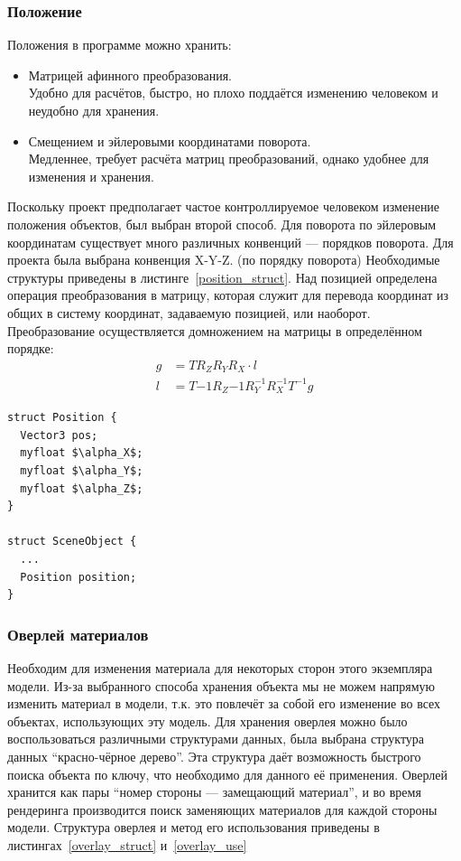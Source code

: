 \documentclass[a4paper,12pt]{report}
\numberwithin{equation}{section}
\begin{document}
\subsubsection{Положение}
Положения в программе можно хранить:
\begin{itemize}
\item Матрицей афинного преобразования. \\
Удобно для расчётов, быстро, но плохо поддаётся изменению человеком и неудобно для хранения.
\item Смещением и эйлеровыми координатами поворота. \\
Медленнее, требует расчёта матриц преобразований, однако удобнее для изменения и хранения.
\end{itemize}
Поскольку проект предполагает частое контроллируемое человеком изменение положения объектов, был выбран второй способ. Для поворота по эйлеровым координатам существует много различных конвенций --- порядков поворота. Для проекта была выбрана конвенция X-Y-Z. (по порядку поворота) Необходимые структуры приведены в листинге~\ref{position_struct}. Над позицией определена операция преобразования в матрицу, которая служит для перевода координат из общих в систему координат, задаваемую позицией, или наоборот. Преобразование осуществляется домножением на матрицы в определённом порядке:
\begin{align}
g &= T R_Z R_Y R_X \cdot l \\
l &= T{-1} R_Z{-1} R_Y^{-1} R_X^{-1} T^{-1} g
\end{align}
\begin{lstlisting}[float=h,caption={Структура данных ``Позиция''},label=position_struct]
struct Position {
  Vector3 pos;
  myfloat $\alpha_X$;
  myfloat $\alpha_Y$;
  myfloat $\alpha_Z$;
}

struct SceneObject {
  ...
  Position position;
}
\end{lstlisting}

\subsubsection{Оверлей материалов}
Необходим для изменения материала для некоторых сторон этого экземпляра модели. Из-за выбранного способа хранения объекта мы не можем напрямую изменить материал в модели, т.к. это повлечёт за собой его изменение во всех объектах, использующих эту модель. Для хранения оверлея можно было воспользоваться различными структурами данных, была выбрана структура данных ``красно-чёрное дерево''. Эта структура даёт возможность быстрого поиска объекта по ключу, что необходимо для данного её применения. Оверлей хранится как пары ``номер стороны --- замещающий материал'', и во время рендеринга производится поиск заменяющих материалов для каждой стороны модели. Структура оверлея и метод его использования приведены в листингах~\ref{overlay_struct} и~\ref{overlay_use}
\end{document}
